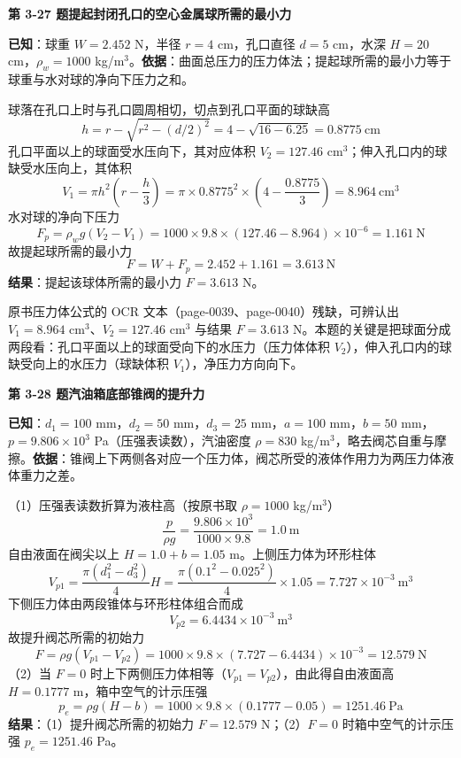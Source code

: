 \noindent\textbf{第 3-27 题\quad 提起封闭孔口的空心金属球所需的最小力}

\begin{jie}
\textbf{已知}：球重 $W=2.452$ N，半径 $r=4$ cm，孔口直径 $d=5$ cm，水深 $H=20$ cm，$\rho_w=1000$ kg/m$^3$。\textbf{依据}：曲面总压力的压力体法；提起球所需的最小力等于球重与水对球的净向下压力之和。

球落在孔口上时与孔口圆周相切，切点到孔口平面的球缺高
\[ h=r-\sqrt{r^2-(d/2)^2}=4-\sqrt{16-6.25}=0.8775\ \mathrm{cm} \]
孔口平面以上的球面受水压向下，其对应体积 $V_2=127.46$ cm$^3$；伸入孔口内的球缺受水压向上，其体积
\[ V_1=\pi h^2\left(r-\frac{h}{3}\right)=\pi\times0.8775^2\times\left(4-\frac{0.8775}{3}\right)=8.964\ \mathrm{cm^3} \]
水对球的净向下压力
\[ F_p=\rho_wg(V_2-V_1)=1000\times9.8\times(127.46-8.964)\times10^{-6}=1.161\ \mathrm{N} \]
故提起球所需的最小力
\[ F=W+F_p=2.452+1.161=3.613\ \mathrm{N} \]
\textbf{结果}：提起该球体所需的最小力 $F=3.613$ N。
\end{jie}

\begin{tishi}
原书压力体公式的 OCR 文本（page-0039、page-0040）残缺，可辨认出 $V_1=8.964$ cm$^3$、$V_2=127.46$ cm$^3$ 与结果 $F=3.613$ N。本题的关键是把球面分成两段看：孔口平面以上的球面受向下的水压力（压力体体积 $V_2$），伸入孔口内的球缺受向上的水压力（球缺体积 $V_1$），净压力方向向下。
\end{tishi}

\noindent\textbf{第 3-28 题\quad 汽油箱底部锥阀的提升力}

\begin{jie}
\textbf{已知}：$d_1=100$ mm，$d_2=50$ mm，$d_3=25$ mm，$a=100$ mm，$b=50$ mm，$p=9.806\times10^3$ Pa（压强表读数），汽油密度 $\rho=830$ kg/m$^3$，略去阀芯自重与摩擦。\textbf{依据}：锥阀上下两侧各对应一个压力体，阀芯所受的液体作用力为两压力体液体重力之差。

（1）压强表读数折算为液柱高（按原书取 $\rho=1000$ kg/m$^3$）
\[ \frac{p}{\rho g}=\frac{9.806\times10^3}{1000\times9.8}=1.0\ \mathrm{m} \]
自由液面在阀尖以上 $H=1.0+b=1.05$ m。上侧压力体为环形柱体
\[ V_{p1}=\frac{\pi(d_1^2-d_3^2)}{4}H=\frac{\pi(0.1^2-0.025^2)}{4}\times1.05=7.727\times10^{-3}\ \mathrm{m^3} \]
下侧压力体由两段锥体与环形柱体组合而成
\[ V_{p2}=6.4434\times10^{-3}\ \mathrm{m^3} \]
故提升阀芯所需的初始力
\[ F=\rho g(V_{p1}-V_{p2})=1000\times9.8\times(7.727-6.4434)\times10^{-3}=12.579\ \mathrm{N} \]
（2）当 $F=0$ 时上下两侧压力体相等（$V_{p1}=V_{p2}$），由此得自由液面高 $H=0.1777$ m，箱中空气的计示压强
\[ p_e=\rho g(H-b)=1000\times9.8\times(0.1777-0.05)=1251.46\ \mathrm{Pa} \]
\textbf{结果}：（1）提升阀芯所需的初始力 $F=12.579$ N；（2）$F=0$ 时箱中空气的计示压强 $p_e=1251.46$ Pa。
\end{jie}

